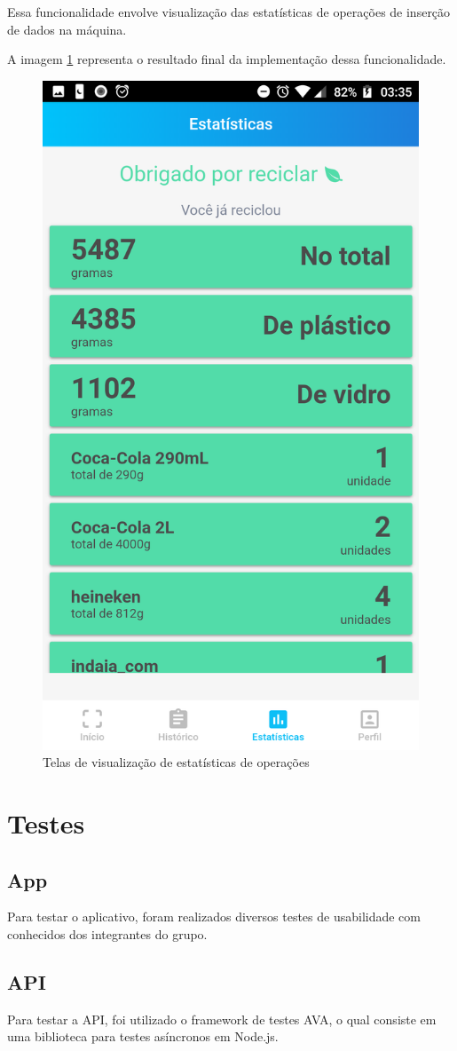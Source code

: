 Essa funcionalidade envolve visualização das estatísticas de operações de inserção de dados na máquina.

A imagem \ref{fig:stat} representa o resultado final da implementação dessa funcionalidade.

\begin{figure}[!ht]
	\centering
		\includegraphics[scale=0.2]{figuras/software/estatisticas.png}
	\caption{Telas de visualização de estatísticas de operações}
	\label{fig:stat}
\end{figure}

\section{Testes}

\subsection{App}

Para testar o aplicativo, foram realizados diversos testes de usabilidade com conhecidos dos integrantes do grupo.

\subsection{API}

Para testar a API, foi utilizado o framework de testes AVA, o qual consiste em uma biblioteca para testes asíncronos em Node.js.
